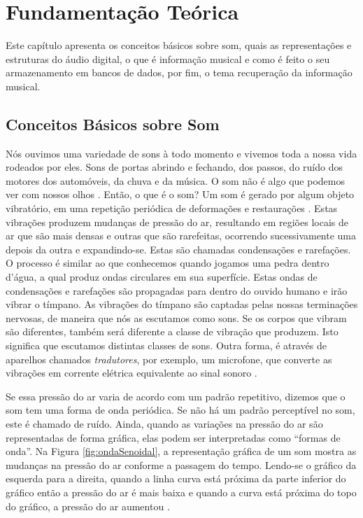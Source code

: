 \chapter{Fundamentação Teórica}
Este capítulo apresenta os conceitos básicos sobre som, quais as representações e estruturas do áudio digital, o que é informação musical e como é feito o seu armazenamento em bancos de dados, por fim, o tema recuperação da informação musical.

\section{Conceitos Básicos sobre Som} \label{conceitoSom}
Nós ouvimos uma variedade de sons à todo momento e vivemos toda a nossa vida rodeados por eles. Sons de portas abrindo e fechando, dos passos, do ruído dos motores dos automóveis, da chuva e da música. O som não é algo que podemos ver com nossos olhos \cite{miletto2004}. Então, o que é o som? 
Um som é gerado por algum objeto vibratório, em uma repetição periódica de deformações e restaurações \cite{muller2007}. Estas vibrações produzem mudanças de pressão do ar, resultando em regiões locais de ar que são mais densas e outras que são rarefeitas, ocorrendo sucessivamente uma depois da outra e expandindo-se. Estas são chamadas condensações e rarefações. O processo é similar ao que conhecemos quando jogamos uma pedra dentro d’água, a qual produz ondas circulares em sua superfície. Estas ondas de condensações e rarefações são propagadas para dentro do ouvido humano e irão vibrar o tímpano. As vibrações do tímpano são captadas pelas nossas terminações nervosas, de maneira que nós as escutamos como sons. Se os corpos que vibram são diferentes, também será diferente a classe de vibração que produzem. Isto significa que escutamos distintas classes de sons.
Outra forma, é através de aparelhos chamados \textit{tradutores}, por exemplo, um microfone, que converte as vibrações em corrente elétrica equivalente ao sinal sonoro \cite{paulozuben2004}.

Se essa pressão do ar varia de acordo com um padrão repetitivo, dizemos que o som tem uma forma de onda periódica. Se não há um padrão perceptível no som, este é chamado de ruído. Ainda, quando as variações na pressão do ar são representadas de forma gráfica, elas podem ser interpretadas como “formas de onda”. Na Figura \ref{fig:ondaSenoidal}, a representação gráfica de um som mostra as mudanças na pressão do ar conforme a passagem do tempo. Lendo-se o gráfico da esquerda para a direita, quando a linha curva está próxima da parte inferior do gráfico então a pressão do ar é mais baixa e quando a curva está próxima do topo do gráfico, a pressão do ar aumentou \cite{miletto2004}.

